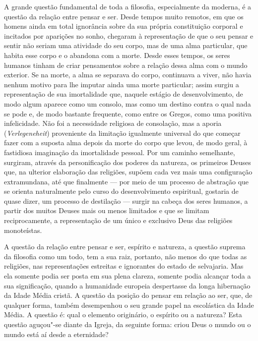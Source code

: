 \noindent{}A grande questão fundamental de toda a filosofia, especialmente da
moderna, é a questão da relação entre pensar e ser. Desde tempos muito
remotos, em que os homens ainda em total ignorância sobre da sua própria
constituição corporal e incitados por aparições no sonho,
chegaram à representação de que o seu pensar e sentir não seriam uma
atividade do seu corpo, mas de uma alma particular, que habita esse
corpo e o abandona com a morte. Desde esses tempos, os seres humanos
tinham de criar pensamentos sobre a relação dessa alma com o mundo
exterior. Se na morte, a alma se separava do corpo, continuava a viver,
não havia nenhum motivo para lhe imputar ainda uma morte particular;
assim surgiu a representação de sua imortalidade que, naquele estágio de
desenvolvimento, de modo algum aparece como um consolo, mas como um
destino contra o qual nada se pode e, de modo bastante frequente, como
entre os Gregos, como uma positiva infelicidade. Não foi a necessidade
religiosa de consolação, mas a aporia (\emph{Verlegeneheit}) proveniente
da limitação igualmente universal do que começar fazer com a suposta
alma depois da morte do corpo que levou, de modo geral, à fastidiosa
imaginação da imortalidade pessoal. Por um caminho semelhante, surgiram,
através da personificação dos poderes da natureza, os primeiros Deuses
que, na ulterior elaboração das religiões, supõem cada vez mais uma
configuração extramundana, até que finalmente --- por meio de um processo
de abstração que se orienta naturalmente pelo curso do desenvolvimento
espiritual, gostaria de quase dizer, um processo de destilação --- surgir
na cabeça dos seres humanos, a partir dos muitos Deuses mais ou menos
limitados e que se limitam reciprocamente, a representação de um único e
exclusivo Deus das religiões monoteístas.

A questão da relação entre pensar e ser, espírito e natureza, a questão
suprema da filosofia como um todo, tem a sua raiz, portanto, não menos
do que todas as religiões, nas representações estreitas e ignorantes do
estado de selvajaria. Mas ela somente podia ser posta em sua plena
clareza, somente podia alcançar toda a sua significação, quando a
humanidade europeia despertasse da longa hibernação da Idade Média
cristã. A questão da posição do pensar em relação ao ser, que, de
qualquer forma, também desempenhou o seu grande papel na escolástica da
Idade Média. A questão é: qual o elemento originário, o espírito ou a
natureza? Esta questão aguçou"-se diante da Igreja, da seguinte forma:
criou Deus o mundo ou o mundo está aí desde a eternidade?

